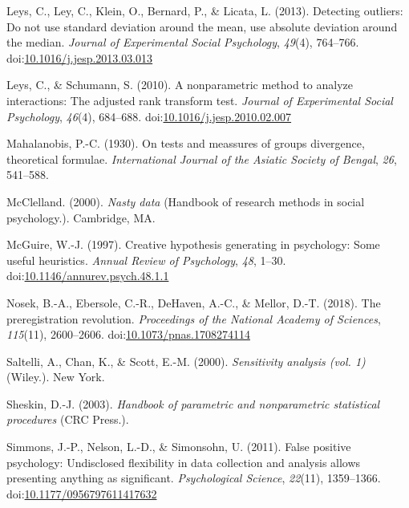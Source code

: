 \documentclass[man,floatsintext]{apa6}
\begin{document}
\leavevmode\hypertarget{ref-Leys_et_al_2013}{}%
Leys, C., Ley, C., Klein, O., Bernard, P., \& Licata, L. (2013). Detecting outliers: Do not use standard deviation around the mean, use absolute deviation around the median. \emph{Journal of Experimental Social Psychology}, \emph{49}(4), 764--766. doi:\href{https://doi.org/10.1016/j.jesp.2013.03.013}{10.1016/j.jesp.2013.03.013}

\leavevmode\hypertarget{ref-Leys_and_Schumann_2010}{}%
Leys, C., \& Schumann, S. (2010). A nonparametric method to analyze interactions: The adjusted rank transform test. \emph{Journal of Experimental Social Psychology}, \emph{46}(4), 684--688. doi:\href{https://doi.org/10.1016/j.jesp.2010.02.007}{10.1016/j.jesp.2010.02.007}

\leavevmode\hypertarget{ref-Mahalanobis_1930}{}%
Mahalanobis, P.-C. (1930). On tests and meassures of groups divergence, theoretical formulae. \emph{International Journal of the Asiatic Society of Bengal}, \emph{26}, 541--588.

\leavevmode\hypertarget{ref-McClelland_2000}{}%
McClelland. (2000). \emph{Nasty data} (Handbook of research methods in social psychology.). Cambridge, MA.

\leavevmode\hypertarget{ref-McGuire_1997}{}%
McGuire, W.-J. (1997). Creative hypothesis generating in psychology: Some useful heuristics. \emph{Annual Review of Psychology}, \emph{48}, 1--30. doi:\href{https://doi.org/10.1146/annurev.psych.48.1.1}{10.1146/annurev.psych.48.1.1}

\leavevmode\hypertarget{ref-Nosek_et_al_2018}{}%
Nosek, B.-A., Ebersole, C.-R., DeHaven, A.-C., \& Mellor, D.-T. (2018). The preregistration revolution. \emph{Proceedings of the National Academy of Sciences}, \emph{115}(11), 2600--2606. doi:\href{https://doi.org/10.1073/pnas.1708274114}{10.1073/pnas.1708274114}

\leavevmode\hypertarget{ref-Saltelli_et_al_2000}{}%
Saltelli, A., Chan, K., \& Scott, E.-M. (2000). \emph{Sensitivity analysis (vol. 1)} (Wiley.). New York.

\leavevmode\hypertarget{ref-Sheskin_2004}{}%
Sheskin, D.-J. (2003). \emph{Handbook of parametric and nonparametric statistical procedures} (CRC Press.).

\leavevmode\hypertarget{ref-Simmons_et_al_2011}{}%
Simmons, J.-P., Nelson, L.-D., \& Simonsohn, U. (2011). False positive psychology: Undisclosed flexibility in data collection and analysis allows presenting anything as significant. \emph{Psychological Science}, \emph{22}(11), 1359--1366. doi:\href{https://doi.org/10.1177/0956797611417632}{10.1177/0956797611417632}
\end{document}
